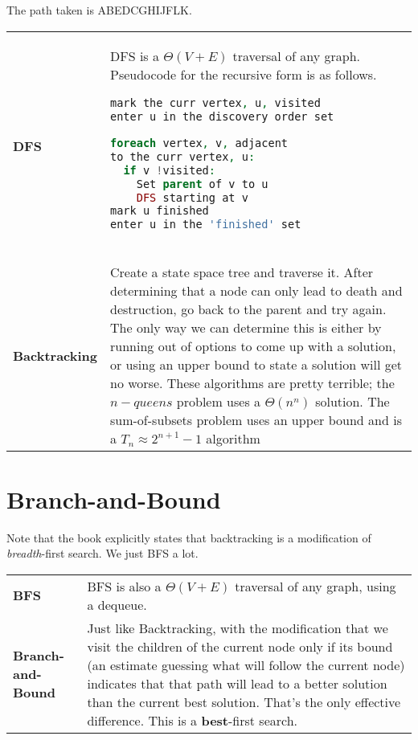 \documentclass[aip, jmp, amsmath,amssymb, reprint]{revtex4-1}
\theoremstyle{definition}
\begin{document}
The path taken is ABEDCGHIJFLK.\\
    
\begin{longtable}{p{2.2cm} p{6cm} }
        \textbf{DFS} & DFS is a  $\Theta(V + E)$ traversal of any graph. Pseudocode for the recursive form is as follows.
\begin{lstlisting}[language=php]
mark the curr vertex, u, visited
enter u in the discovery order set

foreach vertex, v, adjacent 
to the curr vertex, u:
  if v !visited:
    Set parent of v to u
    DFS starting at v
mark u finished 
enter u in the 'finished' set
    
\end{lstlisting}\\
    \textbf{Backtracking} & Create a state space tree and traverse it. After determining that a node can only lead to death and destruction, go back to the parent and try again. The only way we can determine this is either by running out of options to come up with a solution, or using an upper bound to state a solution will get no worse. These algorithms are pretty terrible; the $n-queens$ problem uses a $\Theta(n^n)$ solution. The sum-of-subsets problem uses an upper bound and is a $T_n \approx 2^{n+1}-1$ algorithm
\end{longtable}
\section{Branch-and-Bound}
Note that the book explicitly states that backtracking is a modification of \textit{breadth}-first search. We just BFS a lot.
\begin{longtable}{p{2.2cm} p{6cm} }
    \textbf{BFS} & BFS is also a  $\Theta(V + E)$ traversal of any graph, using a dequeue.\\
    \textbf{Branch-and-Bound} & Just like Backtracking, with the modification that we visit the children of the current node only if its bound (an estimate guessing what will follow the current node) indicates that that path will lead to a better solution than the current best solution. That's the only effective difference. This is a \textbf{best}-first search.
\end{longtable}
\end{document}
